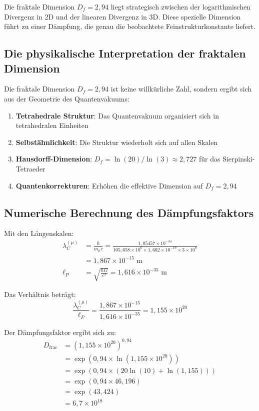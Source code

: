 \documentclass[12pt,a4paper]{article}
\theoremstyle{definition}
\begin{document}
	Die fraktale Dimension $D_f = 2{,}94$ liegt strategisch zwischen der logarithmischen Divergenz in 2D und der linearen Divergenz in 3D. Diese spezielle Dimension führt zu einer Dämpfung, die genau die beobachtete Feinstrukturkonstante liefert.
	
	\subsection{Die physikalische Interpretation der fraktalen Dimension}
	
	Die fraktale Dimension $D_f = 2{,}94$ ist keine willkürliche Zahl, sondern ergibt sich aus der Geometrie des Quantenvakuums:
	
	\begin{enumerate}
		\item \textbf{Tetrahedrale Struktur}: Das Quantenvakuum organisiert sich in tetrahedralen Einheiten
		\item \textbf{Selbstähnlichkeit}: Die Struktur wiederholt sich auf allen Skalen
		\item \textbf{Hausdorff-Dimension}: $D_f = \ln(20)/\ln(3) \approx 2{,}727$ für das Sierpinski-Tetraeder
		\item \textbf{Quantenkorrekturen}: Erhöhen die effektive Dimension auf $D_f = 2{,}94$
	\end{enumerate}
	
	\subsection{Numerische Berechnung des Dämpfungsfaktors}
	
	Mit den Längenskalen:
	\begin{align}
		\lambda_C^{(\mu)} &= \frac{\hbar}{m_\mu c} = \frac{1{,}05457 \times 10^{-34}}{105{,}658 \times 10^6 \times 1{,}602 \times 10^{-19} \times 3 \times 10^8}\\
		&= 1{,}867 \times 10^{-15} \text{ m}\\
		\ell_P &= \sqrt{\frac{\hbar G}{c^3}} = 1{,}616 \times 10^{-35} \text{ m}
	\end{align}
	
	Das Verhältnis beträgt:
	\begin{equation}
		\frac{\lambda_C^{(\mu)}}{\ell_P} = \frac{1{,}867 \times 10^{-15}}{1{,}616 \times 10^{-35}} = 1{,}155 \times 10^{20}
	\end{equation}
	
	Der Dämpfungsfaktor ergibt sich zu:
	\begin{align}
		D_{\text{frac}} &= \left(1{,}155 \times 10^{20}\right)^{0{,}94}\\
		&= \exp(0{,}94 \times \ln(1{,}155 \times 10^{20}))\\
		&= \exp(0{,}94 \times (20 \ln(10) + \ln(1{,}155)))\\
		&= \exp(0{,}94 \times 46{,}196)\\
		&= \exp(43{,}424)\\
		&= 6{,}7 \times 10^{18}
	\end{align}
	
\end{document}
